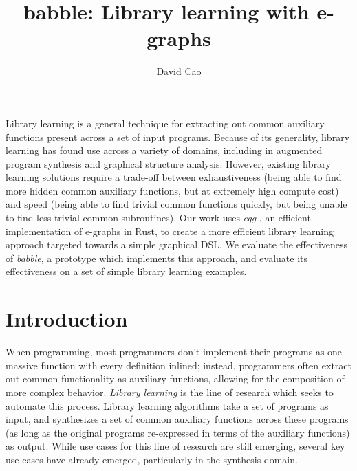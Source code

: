\documentclass[acmsmall,nonacm]{acmart}\settopmatter{}
\begin{document}
\title{babble: Library learning with e-graphs}

\author{David Cao}

\maketitle

Library learning is a general technique for extracting out common auxiliary functions present across a set of input programs. Because of its generality, library learning has found use across a variety of domains, including in augmented program synthesis \cite{ellis_dreamcoder_nodate} and graphical structure analysis. However, existing library learning solutions require a trade-off between exhaustiveness (being able to find more hidden common auxiliary functions, but at extremely high compute cost) and speed (being able to find trivial common functions quickly, but being unable to find less trivial common subroutines). Our work uses \textit{egg} \cite{willsey_egg_2021}, an efficient implementation of e-graphs in Rust, to create a more efficient library learning approach targeted towards a simple graphical DSL. We evaluate the effectiveness of \textit{babble}, a prototype which implements this approach, and evaluate its effectiveness on a set of simple library learning examples.

\section{Introduction}

When programming, most programmers don't implement their programs as one massive function with every definition inlined; instead, programmers often extract out common functionality as auxiliary functions, allowing for the composition of more complex behavior. \textit{Library learning} is the line of research which seeks to automate this process. Library learning algorithms take a set of programs as input, and synthesizes a set of common auxiliary functions across these programs (as long as the original programs re-expressed in terms of the auxiliary functions) as output. While use cases for this line of research are still emerging, several key use cases have already emerged, particularly in the synthesis domain.
\end{document}
